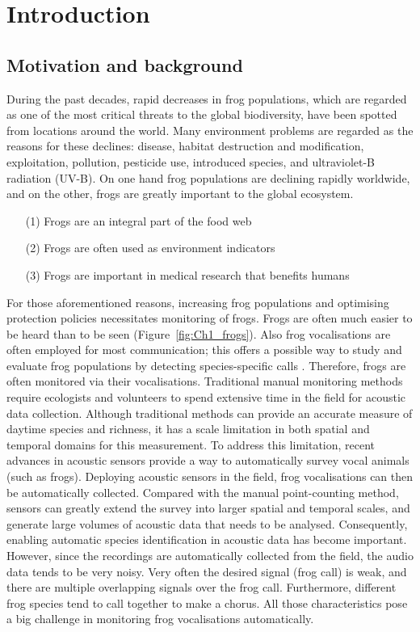 
\chapter[Introduction]{Introduction}
\label{cha:cha1Introduction}
\section{Motivation and background}
During the past decades, rapid decreases in frog populations, which are regarded as one of the most critical threats to the global biodiversity, have been spotted from locations around the world. Many environment problems are regarded as the reasons for these declines: disease, habitat destruction and modification, exploitation, pollution, pesticide use, introduced species, and ultraviolet-B radiation (UV-B). 
On one hand frog populations are declining rapidly worldwide, and on the other, frogs are greatly important to the global ecosystem. 
\begin{enumerate}
\item[(1)] Frogs are an integral part of the food web
\item[(2)] Frogs are often used as environment indicators 
\item[(3)] Frogs are important in medical research that benefits humans 
\end{enumerate}

For those aforementioned reasons, increasing frog populations and optimising protection policies necessitates monitoring of frogs. Frogs are often much easier to be heard than to be seen (Figure~\ref{fig:Ch1_frogs}). Also frog vocalisations are often employed for most communication; this offers a possible way to study and evaluate frog populations by detecting species-specific calls \citep{dorcas2009auditory}. Therefore, frogs are often monitored via their vocalisations. Traditional manual monitoring methods require ecologists and volunteers to spend extensive time in the field for  acoustic data collection. Although traditional methods can provide an accurate measure of daytime species and richness, it has a scale limitation in both spatial and temporal domains for this measurement.
To address this limitation, recent advances in acoustic sensors provide a way to automatically survey vocal animals (such as frogs). Deploying acoustic sensors in the field, frog vocalisations can then be automatically collected. Compared with the manual point-counting method, sensors can greatly extend the survey into larger spatial and temporal scales, and generate large volumes of acoustic data that needs to be analysed. Consequently, enabling automatic species identification in acoustic data has become important. However, since the recordings are automatically collected from the field, the audio data tends to be very noisy. Very often the desired signal (frog call) is weak, and there are multiple overlapping signals over the frog call. Furthermore, different frog species tend to call together to make a chorus. All those characteristics pose a big challenge in monitoring frog vocalisations automatically.

